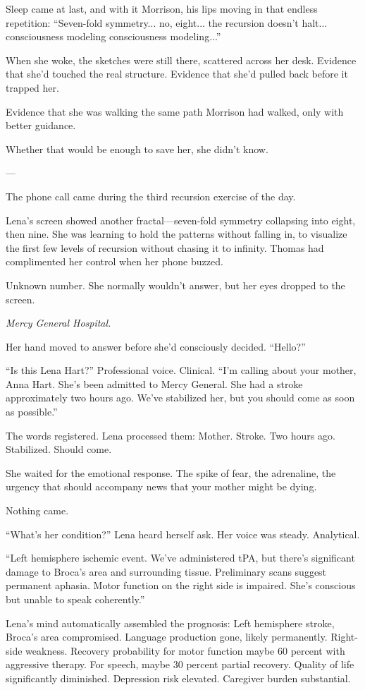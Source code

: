 Sleep came at last, and with it Morrison, his lips moving in that endless repetition: ``Seven-fold symmetry... no, eight... the recursion doesn't halt... consciousness modeling consciousness modeling...''

When she woke, the sketches were still there, scattered across her desk. Evidence that she'd touched the real structure. Evidence that she'd pulled back before it trapped her.

Evidence that she was walking the same path Morrison had walked, only with better guidance.

Whether that would be enough to save her, she didn't know.

---

The phone call came during the third recursion exercise of the day.

Lena's screen showed another fractal—seven-fold symmetry collapsing into eight, then nine. She was learning to hold the patterns without falling in, to visualize the first few levels of recursion without chasing it to infinity. Thomas had complimented her control when her phone buzzed.

Unknown number. She normally wouldn't answer, but her eyes dropped to the screen.

\textit{Mercy General Hospital.}

Her hand moved to answer before she'd consciously decided. ``Hello?''

``Is this Lena Hart?'' Professional voice. Clinical. ``I'm calling about your mother, Anna Hart. She's been admitted to Mercy General. She had a stroke approximately two hours ago. We've stabilized her, but you should come as soon as possible.''

The words registered. Lena processed them: Mother. Stroke. Two hours ago. Stabilized. Should come.

She waited for the emotional response. The spike of fear, the adrenaline, the urgency that should accompany news that your mother might be dying.

Nothing came.

``What's her condition?'' Lena heard herself ask. Her voice was steady. Analytical.

``Left hemisphere ischemic event. We've administered tPA, but there's significant damage to Broca's area and surrounding tissue. Preliminary scans suggest permanent aphasia. Motor function on the right side is impaired. She's conscious but unable to speak coherently.''

Lena's mind automatically assembled the prognosis: Left hemisphere stroke, Broca's area compromised. Language production gone, likely permanently. Right-side weakness. Recovery probability for motor function maybe 60 percent with aggressive therapy. For speech, maybe 30 percent partial recovery. Quality of life significantly diminished. Depression risk elevated. Caregiver burden substantial.

